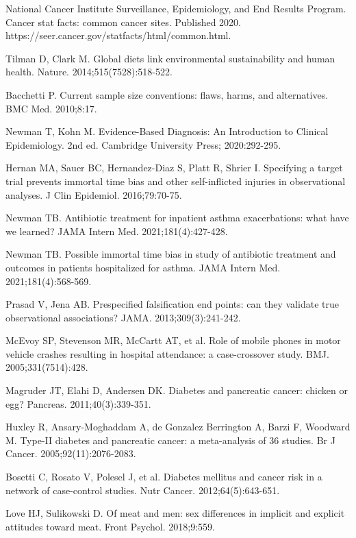 \begingroup\sloppy
\begin{references}
\item National Cancer Institute Surveillance, Epidemiology, and End Results Program. Cancer stat facts: common cancer sites. Published 2020. https://seer.cancer.gov/statfacts/html/common.html.
\item Tilman D, Clark M. Global diets link environmental sustainability and human health. Nature. 2014;515(7528):518-522.
\item Bacchetti P. Current sample size conventions: flaws, harms, and alternatives. BMC Med. 2010;8:17.
\item Newman T, Kohn M. Evidence-Based Diagnosis: An Introduction to Clinical Epidemiology. 2nd ed. Cambridge University Press; 2020:292-295.
\item Hernan MA, Sauer BC, Hernandez-Diaz S, Platt R, Shrier I. Specifying a target trial prevents immortal time bias and other self-inflicted injuries in observational analyses. J Clin Epidemiol. 2016;79:70-75.
\item Newman TB. Antibiotic treatment for inpatient asthma exacerbations: what have we learned? JAMA Intern Med. 2021;181(4):427-428.
\item Newman TB. Possible immortal time bias in study of antibiotic treatment and outcomes in patients hospitalized for asthma. JAMA Intern Med. 2021;181(4):568-569.
\item Prasad V, Jena AB. Prespecified falsification end points: can they validate true observational associations? JAMA. 2013;309(3):241-242.
\item McEvoy SP, Stevenson MR, McCartt AT, et al. Role of mobile phones in motor vehicle crashes resulting in hospital attendance: a case-crossover study. BMJ. 2005;331(7514):428.
\item Magruder JT, Elahi D, Andersen DK. Diabetes and pancreatic cancer: chicken or egg? Pancreas. 2011;40(3):339-351.
\item Huxley R, Ansary-Moghaddam A, de Gonzalez Berrington A, Barzi F, Woodward M. Type-II diabetes and pancreatic cancer: a meta-analysis of 36 studies. Br J Cancer. 2005;92(11):2076-2083.
\item Bosetti C, Rosato V, Polesel J, et al. Diabetes mellitus and cancer risk in a network of case-control studies. Nutr Cancer. 2012;64(5):643-651.
\item Love HJ, Sulikowski D. Of meat and men: sex differences in implicit and explicit attitudes toward meat. Front Psychol. 2018;9:559.

\end{references}
